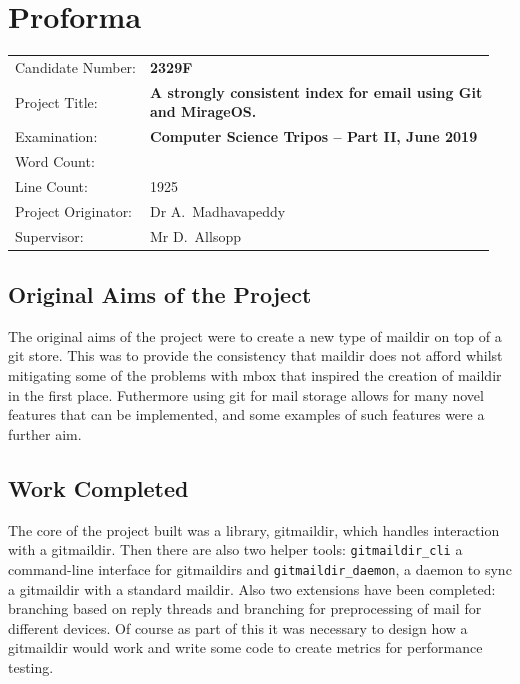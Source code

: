 \documentclass[12pt,a4paper,twoside,openright]{report}
\begin{document}
\chapter*{Proforma}

\begin{adjustbox}{width={\textwidth},totalheight={\textheight},keepaspectratio}%
{\large
\begin{tabular}{ll}
Candidate Number:   & \bf 2329F \\
Project Title:      & \makecell[l]{\bf A strongly consistent index for email using Git \\ \bf and MirageOS.} \\
Examination:        & \bf Computer Science Tripos -- Part II, June 2019 \\
Word Count:         & \bf \footnotemark[1] \\
Line Count:         & 1925\footnotemark[2] \\
Project Originator: & Dr A.~Madhavapeddy \\
Supervisor:         & Mr D.~Allsopp \\
\end{tabular}
}
\end{adjustbox}



\section*{Original Aims of the Project}

The original aims of the project were to create a new type of maildir on top of a git store. This was to provide the consistency that maildir does not afford whilst mitigating some of the problems with mbox that inspired the creation of maildir in the first place. Futhermore using git for mail storage allows for many novel features that can be implemented, and some examples of such features were a further aim.

\section*{Work Completed}

The core of the project built was a library, gitmaildir, which handles interaction with a gitmaildir. Then there are also two helper tools: \texttt{gitmaildir\_cli} a command-line interface for gitmaildirs and \texttt{gitmaildir\_daemon}, a daemon to sync a gitmaildir with a standard maildir. Also two extensions have been completed: branching based on reply threads and branching for preprocessing of mail for different devices. Of course as part of this it was necessary to design how a gitmaildir would work and write some code to create metrics for performance testing.
\end{document}
